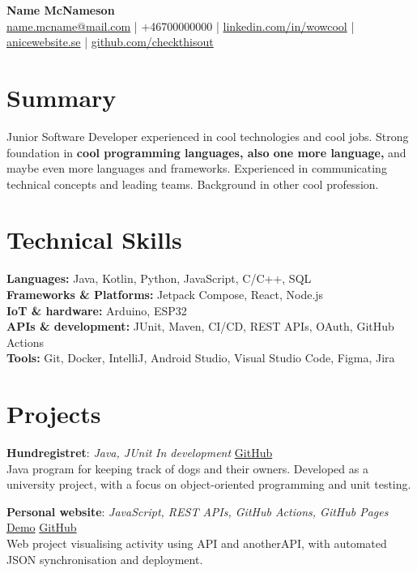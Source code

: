 \documentclass[10pt,a4paper]{article}
\newcommand{\project}[5]{
    \textbf{#1}: \textit{#2}
    \hfill
    \textit{#3}
    \quad
    #4\\[-1pt]
    #5 \vspace{3pt}
}
\begin{document}
\begin{center}
    {\LARGE\bfseries Name McNameson}\\[4pt] %
    \href{mailto:name.mcname@mail.com}{name.mcname@mail.com}
    \quad | \quad
    +46700000000
    \quad | \quad
    \href{https://www.linkedin.com/in/yourlinkedin}{linkedin.com/in/wowcool}
    \quad | \quad
    \href{https://yourcoolwebsite.se}{anicewebsite.se}
    \quad | \quad
    \href{https://github.com}{github.com/checkthisout}
\end{center}
\vspace{-9pt}

\section{Summary}
Junior Software Developer experienced in cool technologies and cool jobs. Strong foundation in \textbf{cool programming languages, also one more language,} and maybe even more languages and frameworks. Experienced in communicating technical concepts and leading teams. Background in other cool profession.

\section{Technical Skills}
\textbf{Languages:} Java, Kotlin, Python, JavaScript, C/C++, SQL\\
\textbf{Frameworks \& Platforms:} Jetpack Compose, React, Node.js\\
\textbf{IoT \& hardware:} Arduino, ESP32 \\
\textbf{APIs \& development:} JUnit, Maven, CI/CD, REST APIs, OAuth, GitHub Actions\\ 
\textbf{Tools:} Git, Docker, IntelliJ, Android Studio, Visual Studio Code, Figma, Jira

\section{Projects}
\project
{Hundregistret}
{Java, JUnit}
{In development}
{\href{https://github.com/}{GitHub}}
{Java program for keeping track of dogs and their owners. Developed as a university project, with a focus on object-oriented programming and unit testing.}

\project
{Personal website}
{JavaScript, REST APIs, GitHub Actions, GitHub Pages}
{}
{\href{linktothesite.link}{Demo} \quad \href{https://github.com}{GitHub}}
{Web project visualising activity using API and anotherAPI, with automated JSON synchronisation and deployment.}
\end{document}
